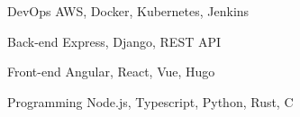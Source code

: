 

\begin{cvskills}

  \cvskill
    {DevOps} %
    {AWS, Docker, Kubernetes, Jenkins} %

  \cvskill
    {Back-end} %
    {Express, Django, REST API} %

  \cvskill
    {Front-end} %
    {Angular, React, Vue, Hugo} %

  \cvskill
    {Programming} %
    {Node.js, Typescript, Python, Rust, C} %

\end{cvskills}
